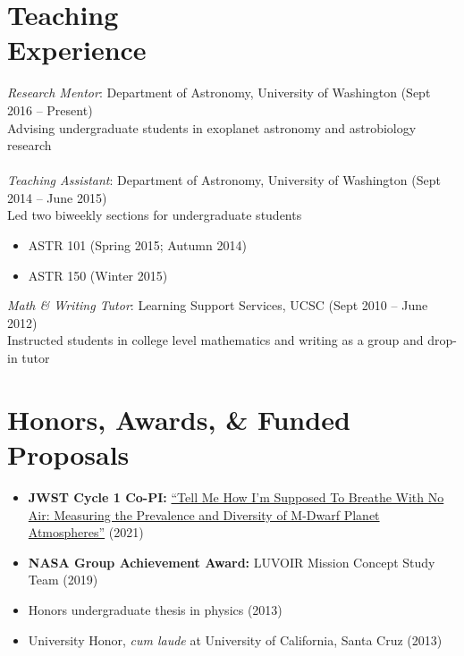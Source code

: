\documentclass[margin,10pt]{res}
\begin{document}
\begin{resume}
\section{Teaching \\Experience} 
                {\sl Research Mentor}: Department of Astronomy, University of Washington \hfill (Sept 2016 -- Present)\\
                Advising undergraduate students in exoplanet astronomy and astrobiology research\\
                \\
                {\sl Teaching Assistant}: Department of Astronomy, University of Washington   \hfill          (Sept 2014 -- June 2015)\\
                Led two biweekly sections for undergraduate students
                    \begin{itemize}  \itemsep -1pt %
                        \item ASTR 101 (Spring 2015; Autumn 2014)
                        \item ASTR 150 (Winter 2015)
                    \end{itemize}  
                
                {\sl Math \& Writing Tutor}: Learning Support Services, UCSC   \hfill          (Sept 2010 -- June 2012)\\
                Instructed students in college level mathematics and writing as a group and drop-in tutor\\
                 
                                  
\section{Honors, Awards, \& Funded Proposals}
                 \begin{itemize}  \itemsep -1pt %
                    \item \textbf{JWST Cycle 1 Co-PI:} \href{https://www.stsci.edu/jwst/science-execution/program-information?id=1981}{``Tell Me How I’m Supposed To Breathe With No Air: Measuring the Prevalence and Diversity of M-Dwarf Planet Atmospheres''} (2021)
                    \item \textbf{NASA Group Achievement Award:} LUVOIR Mission Concept Study Team (2019)
                    \item Honors undergraduate thesis in physics (2013)
                    \item University Honor, \textit{cum laude} at University of California, Santa Cruz (2013)\\
                 \end{itemize}  
                 

\end{resume}
\end{document}
